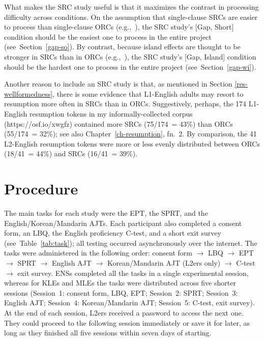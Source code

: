 What makes the SRC study useful is that it maximizes the contrast in processing difficulty across conditions. On the assumption that single-clause SRCs are easier to process than single-clause ORCs (e.g.,~\cite{just.etal1996,king.just1991,lau.tanaka2021,traxler.etal2002}), the SRC study's [Gap, Short] condition should be the easiest one to process in the entire project (see~Section~\ref{gap-so}). By contrast, because island effects are thought to be stronger in SRCs than in ORCs (e.g.,~\cite{han.etal2012,keffala.goodall2011,morgan.wagers2018}), the SRC study's [Gap, Island] condition should be the hardest one to process in the entire project (see~Section~\ref{gap-wi}). 

Another reason to include an SRC study is that, as mentioned in Section \ref{res-wellformedness}, there is some evidence that L1-English adults may resort to resumption more often in SRCs than in ORCs. Suggestively, perhaps, the 174 L1-English resumption tokens in my informally-collected corpus (https://osf.io/xwgfz) contained more SRCs (75/174~= 43\%) than ORCs (55/174~= 32\%); see also Chapter~\ref{ch-resumption}, fn.~2. By comparison, the 41 L2-English resumption tokens were more or less evenly distributed between ORCs (18/41~= 44\%) and SRCs (16/41~= 39\%).\footnotemark{}


\section{Procedure}\label{stu-procedure}

The main tasks for each study were the EPT, the SPRT, and the English/Korean/Mandarin AJTs. Each participant also completed a consent form, an LBQ, the English proficiency C-test, and a short exit survey (see~Table~\ref{tab:task}); all testing occurred asynchronously over the internet. The tasks were administered in the following order: consent form $\rightarrow$ LBQ $\rightarrow$ EPT $\rightarrow$ SPRT $\rightarrow$ English AJT $\rightarrow$ Korean/Mandarin AJT (L2ers only) $\rightarrow$ C-test $\rightarrow$ exit survey. ENSs completed all the tasks in a single experimental session, whereas for KLEs and MLEs the tasks were distributed across five shorter sessions (Session~1: consent form, LBQ, EPT; Session~2: SPRT; Session~3: English AJT; Session~4: Korean/Mandarin AJT; Session~5: C-test, exit survey). At the end of each session, L2ers received a password to access the next one. They could proceed to the following session immediately or save it for later, as long as they finished all five sessions within seven days of starting. 

